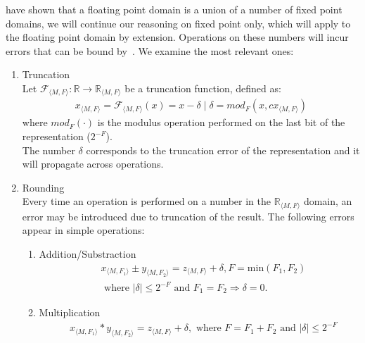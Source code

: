 \documentclass[sigconf]{llncs}
\newcommand{\jrronly}[1]{{}}
\begin{document}
have shown that a floating point domain is a union of a number of fixed
point domains, we will continue our reasoning on fixed point only, which
will apply to the floating point domain by extension.  Operations on these
numbers will incur errors that can be bound
by~\cite{DBLP:conf/arith/BrainTRW15}.  
We examine the most relevant ones:
%
\begin{enumerate}
\item Truncation\\
Let $\mathcal{F}_{\langle M,F \rangle} : \mathbb{R} \rightarrow \mathbb{R}_{\langle M,F \rangle}$
be a truncation function, defined as:
\begin{align*}
x_{\langle M,F \rangle}=\mathcal{F}_{\langle M,F \rangle}(x) = x-\delta \mid \delta=mod_F(x,c x_{\langle M,F \rangle})
\end{align*} 
where $mod_F(\cdot)$ is the modulus operation performed on the last bit of the representation ($2^{-F}$).\\
The number $\delta$ corresponds to the truncation error of the representation and it will propagate across operations.
\jrronly{
%
It is worth mentioning that not all systems truncate equally.  In the
definition above $\delta$ may be positive or negative, and even this
decision can be made dependent on the sign of $x$.  Common cases in computer
systems are: round downwards (\emph{ie} to $-\infty$), round upwards
(\emph{ie} to $+\infty$), and round to zero.  Rounding errors are cumulative
which means the overall error will statistically increase with every
operation, thus algorithms performing fewer operations can be more precise
in this respect than iterative ones.
%
}
\item Rounding\\
Every time an operation is performed on a number in the $\mathbb{R}_{\langle M,F \rangle}$ domain, an error may be
introduced due to truncation of the result. 
The following errors appear in simple operations:
\begin{enumerate}
\item Addition/Substraction
\begin{align*}
&x_{\langle M,F_1\rangle} \pm y_{\langle M,F_2\rangle}=z_{\langle M,F\rangle} + \delta,  F=\text{min}(F_1,F_2)\\
&\text{ where } |\delta| \leq 2^{-F} \text{ and } F_1=F_2 \Rightarrow \delta=0.
\end{align*}
\item Multiplication
\begin{align*}
&x_{\langle M,F_1\rangle} * y_{\langle M,F_2\rangle}=z_{\langle M,F\rangle} + \delta, \text{ where } F=F_1+F_2 \text{ and } |\delta| \leq 2^{-F}

\end{align*}
\end{enumerate}
\end{enumerate}
\end{document}
